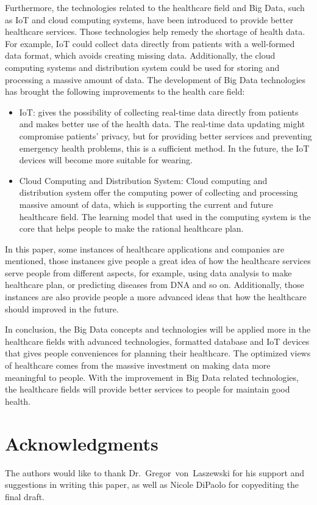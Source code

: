 Furthermore, the technologies related 
to the healthcare field and Big 
Data, such as IoT and cloud computing systems, 
have been introduced to provide better 
healthcare services. 
Those technologies help 
remedy the shortage of health data. 
For example, IoT could collect 
data directly from patients with a 
well-formed data format, which 
avoids creating missing data.
Additionally, the cloud computing 
systems and distribution system 
could be used for storing and
processing a massive amount of data. 
The development of Big Data technologies 
has brought the 
following improvements to the
health care field:
\begin{itemize}
	\item IoT: gives the possibility of collecting real-time 
	data directly from patients and 
	makes better use of the health data. 
	The real-time data updating might compromise
	patients' privacy, but for providing better services 
	and preventing emergency health 
	problems, this is a sufficient method. In the future, 
	the IoT devices will become more
	suitable for wearing.
	\item Cloud Computing and Distribution System:
	Cloud computing and distribution system offer 
	the computing power of collecting and
	 processing massive amount of data, which is 
	 supporting the current and future 
	 healthcare field. The learning model that used 
	 in the computing system is the core that 
	 helps people to make the rational healthcare plan.
\end{itemize}

In this paper, some instances of healthcare applications 
and companies are mentioned, 
those instances give people a great idea of how the 
healthcare services serve people 
from different aspects, for example, 
using data analysis to make healthcare plan, 
or predicting diseases from DNA and so on. 
Additionally, those instances are also provide people a more 
advanced ideas that how the 
healthcare should improved in the future.

In conclusion, the Big Data concepts and 
technologies will be applied more in the 
healthcare fields with advanced technologies, 
formatted database and IoT devices 
that gives people conveniences for planning 
their healthcare. The optimized views 
of healthcare comes from the massive investment 
on making data more meaningful 
to people. With the improvement in Big Data 
related technologies, the healthcare
fields will provide better services to people for 
maintain good health.
\section{Acknowledgments}
\begin{acks}

  The authors would like to thank Dr.~Gregor~von~Laszewski for his
  support and suggestions in writing this paper, as well as Nicole 
  DiPaolo for copyediting the final draft.

\end{acks}


 

